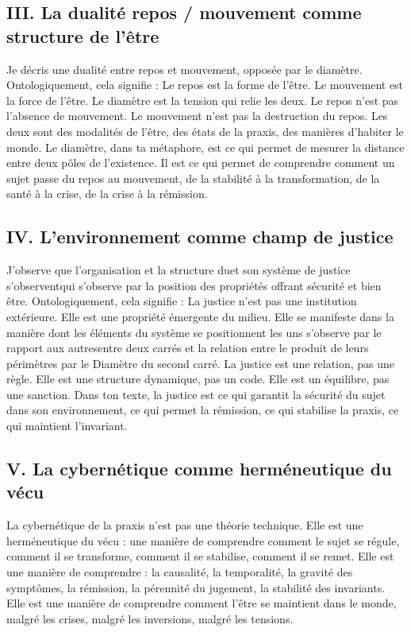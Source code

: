 \documentclass[12pt,a4paper]{article}
\begin{document}
\subsection*{III. La dualité repos / mouvement comme structure de l’être}
Je décris une dualité entre repos et mouvement, opposée par le diamètre. Ontologiquement, cela signifie :
	Le repos est la forme de l’être.
	Le mouvement est la force de l’être.
	Le diamètre est la tension qui relie les deux.
Le repos n’est pas l’absence de mouvement. Le mouvement n’est pas la destruction du repos. Les deux sont des modalités de l’être, des états de la praxis, des manières d’habiter le monde.
Le diamètre, dans ta métaphore, est ce qui permet de mesurer la distance entre deux pôles de l’existence. Il est ce qui permet de comprendre comment un sujet passe du repos au mouvement, de la stabilité à la transformation, de la santé à la crise, de la crise à la rémission.

\subsection*{IV. L’environnement comme champ de justice}
J’observe que l’organisation et la structure duet son système de justice s’observentqui s’observe par la position des propriétés offrant sécurité et bien  être. Ontologiquement, cela signifie :
	La justice n’est pas une institution extérieure.
	Elle est une propriété émergente du milieu.
	Elle se manifeste dans la manière dont les éléments du système se positionnent les uns s’observe par le rapport aux autresentre deux carrés et la relation entre le produit de leurs périmètres par le Diamètre du second carré.
La justice est une relation, pas une règle. Elle est une structure dynamique, pas un code. Elle est un équilibre, pas une sanction.
Dans ton texte, la justice est ce qui garantit la sécurité du sujet dans son environnement, ce qui permet la rémission, ce qui stabilise la praxis, ce qui maintient l’invariant.

\subsection*{V. La cybernétique comme herméneutique du vécu}
La cybernétique de la praxis n’est pas une théorie technique. Elle est une herméneutique du vécu : une manière de comprendre comment le sujet se régule, comment il se transforme, comment il se stabilise, comment il se remet.
Elle est une manière de comprendre :
	la causalité,
	la temporalité,
	la gravité des symptômes,
	la rémission,
	la pérennité du jugement,
	la stabilité des invariants.
Elle est une manière de comprendre comment l’être se maintient dans le monde, malgré les crises, malgré les inversions, malgré les tensions.
\end{document}
